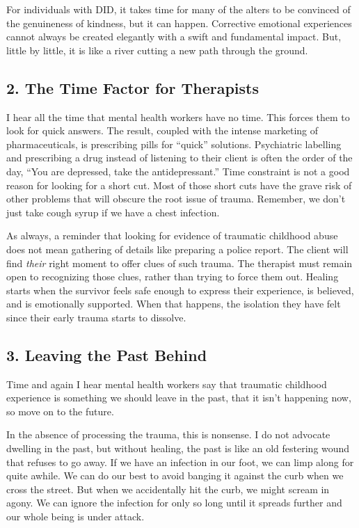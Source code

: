 \documentclass[]{book}
\begin{document}
For individuals with DID, it takes time for many of the alters to be convinced of the genuineness of kindness, but it can happen. Corrective emotional experiences cannot always be created elegantly with a swift and fundamental impact. But, little by little, it is like a river cutting a new path through the ground.

\hypertarget{the-time-factor-for-therapists}{%
\subsection*{2. The Time Factor for Therapists}\label{the-time-factor-for-therapists}}

I hear all the time that mental health workers have no time. This forces them to look for quick answers. The result, coupled with the intense marketing of pharmaceuticals, is prescribing pills for ``quick'' solutions. Psychiatric labelling and prescribing a drug instead of listening to their client is often the order of the day, ``You are depressed, take the antidepressant.'' Time constraint is not a good reason for looking for a short cut. Most of those short cuts have the grave risk of other problems that will obscure the root issue of trauma. Remember, we don't just take cough syrup if we have a chest infection.

As always, a reminder that looking for evidence of traumatic childhood abuse does not mean gathering of details like preparing a police report. The client will find \emph{their} right moment to offer clues of such trauma. The therapist must remain open to recognizing those clues, rather than trying to force them out. Healing starts when the survivor feels safe enough to express their experience, is believed, and is emotionally supported. When that happens, the isolation they have felt since their early trauma starts to dissolve.

\hypertarget{leaving-the-past-behind}{%
\subsection*{3. Leaving the Past Behind}\label{leaving-the-past-behind}}

Time and again I hear mental health workers say that traumatic childhood experience is something we should leave in the past, that it isn't happening now, so move on to the future.

In the absence of processing the trauma, this is nonsense. I do not advocate dwelling in the past, but without healing, the past is like an old festering wound that refuses to go away. If we have an infection in our foot, we can limp along for quite awhile. We can do our best to avoid banging it against the curb when we cross the street. But when we accidentally hit the curb, we might scream in agony. We can ignore the infection for only so long until it spreads further and our whole being is under attack.
\end{document}
